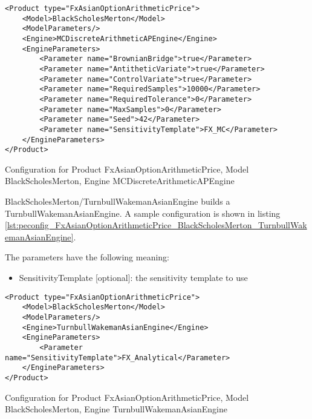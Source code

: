 \begin{longlisting}
\begin{verbatim}
<Product type="FxAsianOptionArithmeticPrice">
    <Model>BlackScholesMerton</Model>
    <ModelParameters/>
    <Engine>MCDiscreteArithmeticAPEngine</Engine>
    <EngineParameters>
        <Parameter name="BrownianBridge">true</Parameter>    
        <Parameter name="AntitheticVariate">true</Parameter>    
        <Parameter name="ControlVariate">true</Parameter>    
        <Parameter name="RequiredSamples">10000</Parameter>    
        <Parameter name="RequiredTolerance">0</Parameter>    
        <Parameter name="MaxSamples">0</Parameter>    
        <Parameter name="Seed">42</Parameter>    
        <Parameter name="SensitivityTemplate">FX_MC</Parameter>
    </EngineParameters>
</Product>
\end{verbatim}
\caption{Configuration for Product FxAsianOptionArithmeticPrice, Model BlackScholesMerton, Engine MCDiscreteArithmeticAPEngine}
\label{lst:peconfig_FxAsianOptionArithmeticPrice_BlackScholesMerton_MCDiscreteArithmeticAPEngine}
\end{longlisting}

BlackScholesMerton/TurnbullWakemanAsianEngine builds a TurnbullWakemanAsianEngine. A sample configuration is shown in
listing \ref{lst:peconfig_FxAsianOptionArithmeticPrice_BlackScholesMerton_TurnbullWakemanAsianEngine}.

The parameters have the following meaning:

\begin{itemize}
\item SensitivityTemplate [optional]: the sensitivity template to use 
\end{itemize}

\begin{longlisting}
\begin{verbatim}
<Product type="FxAsianOptionArithmeticPrice">
    <Model>BlackScholesMerton</Model>
    <ModelParameters/>
    <Engine>TurnbullWakemanAsianEngine</Engine>
    <EngineParameters>
        <Parameter name="SensitivityTemplate">FX_Analytical</Parameter>
    </EngineParameters>
</Product>
\end{verbatim}
\caption{Configuration for Product FxAsianOptionArithmeticPrice, Model BlackScholesMerton, Engine TurnbullWakemanAsianEngine}
\label{lst:peconfig_FxAsianOptionArithmeticPrice_BlackScholesMerton_TurnbullWakemanAsianEngine}
\end{longlisting}

